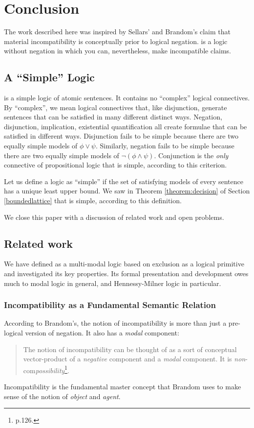 \section{Conclusion}\label{conclusion}

The work described here was inspired by Sellars' and Brandom's claim
that material incompatibility is conceptually prior to logical
negation.
\Cathoristic{} is a logic without negation in which you can, nevertheless, make incompatible claims.

\subsection{A ``Simple'' Logic}
\Cathoristic{} is a simple logic of atomic sentences.  It contains no
``complex'' logical connectives.  
By ``complex'', we mean logical
connectives that, like disjunction, generate sentences that can be
satisfied in many different distinct ways.  
Negation, disjunction,
implication, existential quantification all create formulae that can
be satisfied in different ways.  
 Disjunction
fails to be simple because there are two equally simple models of
$\phi \lor \psi$.  Similarly, negation fails to be simple because
there are two equally simple models of $\neg (\phi \land \psi)$.
Conjunction is the \emph{only} connective of propositional logic that
is simple, according to this criterion.

Let us define a logic as ``simple'' if the set of satisfying
models of every sentence has a unique least upper bound. 
We saw in Theorem \ref{theorem:decision} of Section \ref{boundedlattice} that \cathoristic{} is simple, according to this definition.

 We close this paper with a discussion of related work and open
problems.

\subsection{Related work} 

We have defined \cathoristic{} as a multi-modal logic based on
exclusion as a logical primitive and investigated its key properties.
Its formal presentation and development owes much to modal
logic in general, and Hennessy-Milner logic in particular.

\subsubsection{Incompatibility as a Fundamental Semantic Relation}
According to Brandom's, the notion of incompatibility is more than just a pre-logical version of negation. 
It also has a \emph{modal} component:
\begin{quote}
The notion of incompatibility can be thought of as a sort of conceptual vector-product of a \emph{negative} component and a \emph{modal} component. It is \emph{non}-com\emph{possibility}\footnote{\cite{brandom} p.126.}.
\end{quote}
Incompatibility is the fundamental master concept that Brandom uses to make sense of the notion of \emph{object} and \emph{agent}.

